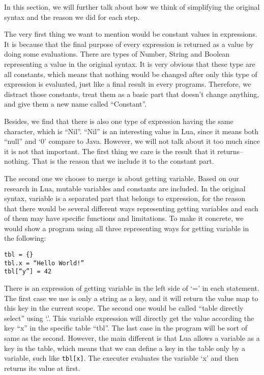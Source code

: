 \documentclass{article}
\begin{document}
In this section, we will further talk about how we think of simplifying the original syntax and the reason we did for each step.

The very first thing we want to mention would be constant values in expressions. It is because that the final purpose of every expression is returned as a value by doing some evaluations. There are types of Number, String and Boolean representing a value in the original syntax. It is very obvious that these type are all constants, which means that nothing would be changed after only this type of expression is evaluated, just like a final result in every programs. Therefore, we distract those constants, treat them as a basic part that doesn’t change anything, and give them a new name called ``Constant''.

Besides, we find that there is also one type of expression having the same character, which is ``Nil''. ``Nil'' is an interesting value in Lua, since it means both ``null'' and `0' compare to Java. However, we will not talk about it too much since it is not that important. The first thing we care is the result that it returns--nothing. That is the reason that we include it to the constant part.

The second one we choose to merge is about getting variable. Based on our research in Lua, mutable variables and constants are included. In the original syntax, variable is a separated part that belongs to expression, for the reason that there would be several different ways representing getting variables and each of them may have specific functions and limitations. To make it concrete, we would show a program using all three representing ways for getting variable in the following:
\begin{flushleft}
\tt tbl = \{\}\\
\tt tbl.x = ``Hello World!''\\
\tt tbl[``y''] = 42\\
\end{flushleft}

There is an expression of getting variable in the left side of `=' in each statement. The first case we use is only a string as a key, and it will return the value map to this key in the current scope. The second one would be called ``table directly select'' using `.'. This variable expression will directly get the value according the key ``x'' in the specific table ``tbl''. The last case in the program will be sort of same as the second. However, the main different is that Lua allows a variable as a key in the table, which means that we can define a key in the table only by a variable, such like {\tt tbl[x]}. The executer evaluates the variable `x’ and then returns its value at first.
\end{document}
